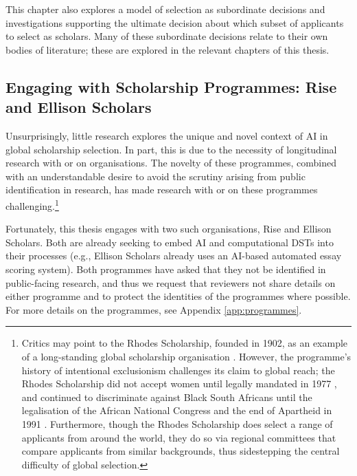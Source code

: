 This chapter also explores a model of selection as subordinate decisions and investigations supporting the ultimate decision about which subset of applicants to select as scholars. Many of these subordinate decisions relate to their own bodies of literature; these are explored in the relevant chapters of this thesis.

\subsection{Engaging with Scholarship Programmes: Rise and Ellison Scholars}\label{ssec:context_empirical_setting}
Unsurprisingly, little research explores the unique and novel context of AI in global scholarship selection. In part, this is due to the necessity of longitudinal research with or on organisations. The novelty of these programmes, combined with an understandable desire to avoid the scrutiny arising from public identification in research, has made research with or on these programmes challenging.\footnote{Critics may point to the Rhodes Scholarship, founded in 1902, as an example of a long-standing global scholarship organisation \cite{Ziegler_2008}. However, the programme's history of intentional exclusionism challenges its claim to global reach; the Rhodes Scholarship did not accept women until legally mandated in 1977 \cite{Ziegler_2008}, and continued to discriminate against Black South Africans until the legalisation of the African National Congress and the end of Apartheid in 1991 \cite{Ziegler_2008}. Furthermore, though the Rhodes Scholarship does select a range of applicants from around the world, they do so via regional committees that compare applicants from similar backgrounds, thus sidestepping the central difficulty of global selection.}

Fortunately, this thesis engages with two such organisations, Rise and Ellison Scholars. Both are already seeking to embed AI and computational DSTs into their processes (e.g., Ellison Scholars already uses an AI-based automated essay scoring system). Both programmes have asked that they not be identified in public-facing research, and thus we request that reviewers not share details on either programme and to protect the identities of the programmes where possible. For more details on the programmes, see Appendix \ref{app:programmes}.

